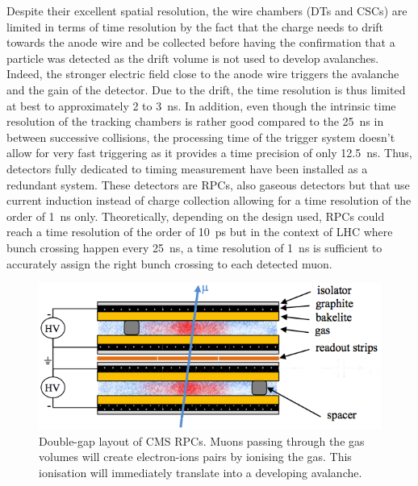 	Despite their excellent spatial resolution, the wire chambers (DTs and CSCs) are limited in terms of time resolution by the fact that the charge needs to drift towards the anode wire and be collected before having the confirmation that a particle was detected as the drift volume is not used to develop avalanches. Indeed, the stronger electric field close to the anode wire triggers the avalanche and the gain of the detector. Due to the drift, the time resolution is thus limited at best to approximately 2 to \SI{3}{ns}. In addition, even though the intrinsic time resolution of the tracking chambers is rather good compared to the \SI{25}{ns} in between successive collisions, the processing time of the trigger system doesn't allow for very fast triggering as it provides a time precision of only \SI{12.5}{ns}. Thus, detectors fully dedicated to timing measurement have been installed as a redundant system. These detectors are RPCs, also gaseous detectors but that use current induction instead of charge collection allowing for a time resolution of the order of \SI{1}{ns} only. Theoretically, depending on the design used, RPCs could reach a time resolution of the order of \SI{10}{ps} but in the context of LHC where bunch crossing happen every \SI{25}{ns}, a time resolution of \SI{1}{ns} is sufficient to accurately assign the right bunch crossing to each detected muon.
	
\begingroup\setlength{\intextsep}{0pt}\setlength{\columnsep}{15pt}

	\begin{figure}
		\centering
		\includegraphics[width=0.9\linewidth]{fig/chapt2/RPC_DG_layout.png}
		\caption{\label{fig:RPC-DG-layout} Double-gap layout of CMS RPCs. Muons passing through the gas volumes will create electron-ions pairs by ionising the gas. This ionisation will immediately translate into a developing avalanche.}
	\end{figure}
	
